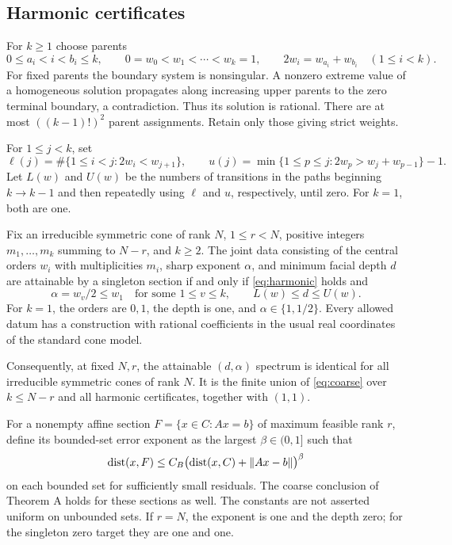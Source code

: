 \subsection{Harmonic certificates}
For $k\ge1$ choose parents
\begin{equation}\label{eq:harmonic}
0\le a_i<i<b_i\le k,\qquad
0=w_0<w_1<\cdots<w_k=1,\qquad
2w_i=w_{a_i}+w_{b_i}\quad(1\le i<k).
\end{equation}
For fixed parents the boundary system is nonsingular. A nonzero extreme value of a homogeneous solution propagates along increasing upper parents to the zero terminal boundary, a contradiction. Thus its solution is rational. There are at most $((k-1)!)^2$ parent assignments. Retain only those giving strict weights.

For $1\le j<k$, set
\begin{equation}\label{eq:peeling}
\ell(j)=\#\{1\le i<j:2w_i<w_{j+1}\},\qquad
u(j)=\min\{1\le p\le j:2w_p>w_j+w_{p-1}\}-1.
\end{equation}
Let $L(w)$ and $U(w)$ be the numbers of transitions in the paths beginning $k\to k-1$ and then repeatedly using $\ell$ and $u$, respectively, until zero. For $k=1$, both are one.

\begin{theoremA}\label{thm:A}
Fix an irreducible symmetric cone of rank $N$, $1\le r<N$, positive integers $m_1,\ldots,m_k$ summing to $N-r$, and $k\ge2$. The joint data consisting of the central orders $w_i$ with multiplicities $m_i$, sharp exponent $\alpha$, and minimum facial depth $d$ are attainable by a singleton section if and only if \eqref{eq:harmonic} holds and
\begin{equation}\label{eq:coarse}
 \alpha=w_v/2\le w_1\quad\text{for some }1\le v\le k,
 \qquad L(w)\le d\le U(w).
\end{equation}
For $k=1$, the orders are $0,1$, the depth is one, and $\alpha\in\{1,1/2\}$. Every allowed datum has a construction with rational coefficients in the usual real coordinates of the standard cone model.

Consequently, at fixed $N,r$, the attainable $(d,\alpha)$ spectrum is identical for all irreducible symmetric cones of rank $N$. It is the finite union of \eqref{eq:coarse} over $k\le N-r$ and all harmonic certificates, together with $(1,1)$.
\end{theoremA}

For a nonempty affine section $F=\{x\in C:Ax=b\}$ of maximum feasible rank $r$, define its bounded-set error exponent as the largest $\beta\in(0,1]$ such that
\begin{equation}\label{eq:set-error}
 \operatorname{dist}(x,F)\le C_B\bigl(\operatorname{dist}(x,C)+\lVert Ax-b\rVert\bigr)^\beta
\end{equation}
on each bounded set for sufficiently small residuals. The coarse conclusion of Theorem A holds for these sections as well. The constants are not asserted uniform on unbounded sets. If $r=N$, the exponent is one and the depth zero; for the singleton zero target they are one and one.


